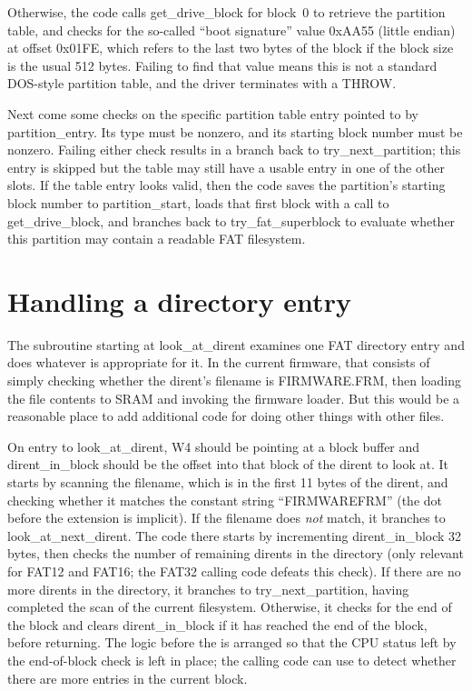 Otherwise, the code calls get\_drive\_block for block~0 to retrieve the
partition table, and checks for the so-called ``boot signature'' value
0xAA55 (little endian) at offset 0x01FE, which refers to the last two bytes
of the block if the block size is the usual 512 bytes.  Failing to find that
value means this is not a standard DOS-style partition table, and the driver
terminates with a THROW.

Next come some checks on the specific partition table entry pointed to by
partition\_entry.  Its type must be nonzero, and its starting block number
must be nonzero.  Failing either check results in a branch back to
try\_next\_partition; this entry is skipped but the table may still have a
usable entry in one of the other slots.  If the table entry looks valid,
then the code saves the partition's starting block number to
partition\_start, loads that first block with a call to get\_drive\_block,
and branches back to try\_fat\_superblock to evaluate whether this partition
may contain a readable FAT filesystem.

\section{Handling a directory entry}

The subroutine starting at look\_at\_dirent examines one FAT directory entry
and does whatever is appropriate for it.  In the current firmware, that
consists of simply checking whether the dirent's filename is FIRMWARE.FRM,
then loading the file contents to SRAM and invoking the firmware loader. 
But this would be a reasonable place to add additional code for doing other
things with other files.

On entry to look\_at\_dirent, W4 should be pointing at a block buffer and
dirent\_in\_block should be the offset into that block of the dirent to look
at.  It starts by scanning the filename, which is in the first 11 bytes of
the dirent, and checking whether it matches the constant string
``FIRMWAREFRM'' (the dot before the extension is implicit).  If the filename
does \emph{not} match, it branches to look\_at\_next\_dirent.  The code
there starts by incrementing dirent\_in\_block 32 bytes, then checks the
number of remaining dirents in the directory (only relevant for FAT12 and
FAT16; the FAT32 calling code defeats this check).  If there are no more
dirents in the directory, it branches to try\_next\_partition, having
completed the scan of the current filesystem.  Otherwise, it checks for the
end of the block and clears dirent\_in\_block if it has reached the end of
the block, before returning.  The logic before the  is arranged
so that the CPU status left by the end-of-block check is left in place; the
calling code can use  to detect whether there are more entries
in the current block.

